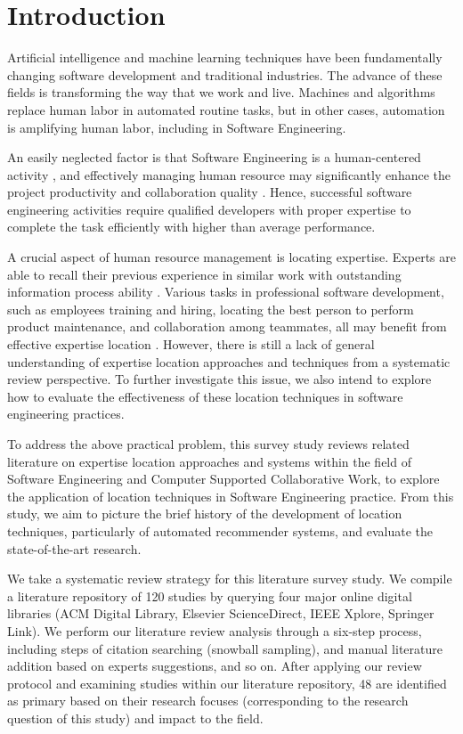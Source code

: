 \chapter{Introduction}

Artificial intelligence and machine learning techniques have been fundamentally changing software development and traditional industries. The advance of these fields is transforming the way that we work and live. Machines and algorithms replace human labor in automated routine tasks, but in other cases, automation is amplifying human labor, including in Software Engineering.

An easily neglected factor is that Software Engineering is a human-centered activity \cite{fischer2003desert}, and effectively managing human resource may significantly enhance the project productivity and collaboration quality \cite{brooks1995mythical}. Hence, successful software engineering activities require qualified developers with proper expertise to complete the task efficiently with higher than average performance. 

A crucial aspect of human resource management is locating expertise. Experts are able to recall their previous experience in similar work \cite{bilalić2017neuroscience,ericsson2006cambridge} with outstanding information process ability \cite{Simon:1996:SA:237774}. Various tasks in professional software development, such as employees training and hiring, locating the best person to perform product maintenance, and collaboration among teammates, all may benefit from effective expertise location \citep{bergersen2014construction}. However, there is still a lack of general understanding of expertise location approaches and techniques from a systematic review perspective. To further investigate this issue, we also intend to explore how to evaluate the effectiveness of these location techniques in software engineering practices.

To address the above practical problem, this survey study reviews related literature on expertise location approaches and systems within the field of Software Engineering and Computer Supported Collaborative Work, to explore the application of location techniques in Software Engineering practice. From this study, we aim to picture the brief history of the development of location techniques, particularly of automated recommender systems, and evaluate the state-of-the-art research.

We take a systematic review strategy for this literature survey study. We compile a literature repository of 120 studies by querying four major online digital libraries (ACM Digital Library, Elsevier ScienceDirect, IEEE Xplore, Springer Link). We perform our literature review analysis through a six-step process, including steps of citation searching (snowball sampling), and manual literature addition based on experts suggestions, and so on. After applying our review protocol and examining studies within our literature repository, 48 are identified as primary based on their research focuses (corresponding to the research question of this study) and impact to the field.

